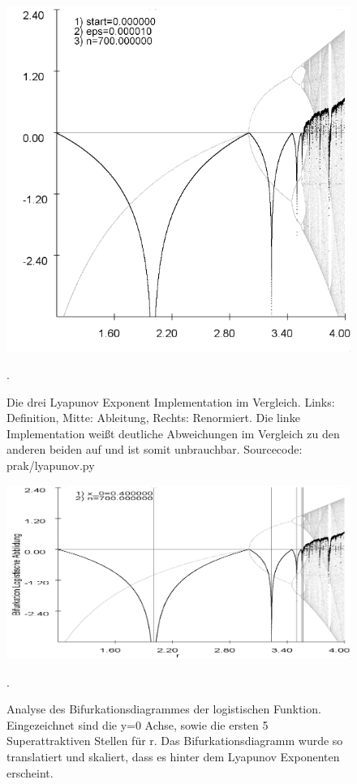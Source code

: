 \documentclass{scrartcl}
\begin{document}
\begin{figure}
\includegraphics[scale=0.28]{iteration/lyapunov-3}
\caption{Die drei Lyapunov Exponent Implementation im Vergleich. Links: Definition, Mitte: Ableitung, Rechts: Renormiert. Die linke Implementation weißt deutliche Abweichungen im Vergleich zu den anderen beiden auf und ist somit unbrauchbar. Sourcecode: prak/lyapunov.py}. 
\end{figure}
\begin{figure}
\centering
\includegraphics[scale=0.45]{iteration/bifurk-log-lyapunov-periode}
\caption{Analyse des Bifurkationsdiagrammes der logistischen Funktion. Eingezeichnet sind die y=0 Achse, sowie die ersten 5 Superattraktiven Stellen für r. Das Bifurkationsdiagramm wurde so translatiert und skaliert, dass es hinter dem Lyapunov Exponenten erscheint.}. 
\end{figure}
\end{document}
